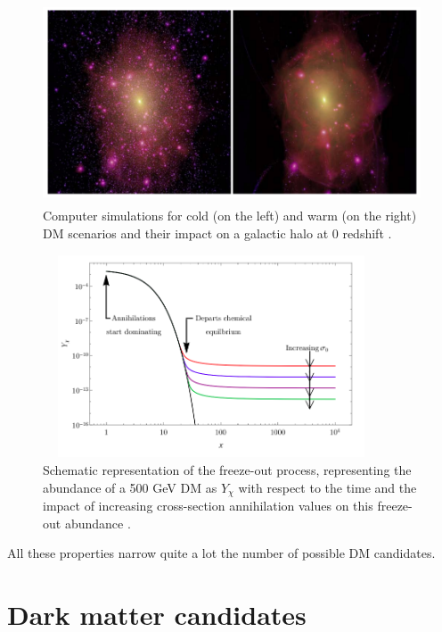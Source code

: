 \documentclass[a4paper, 10pt, openright]{report}
\begin{document}
\begin{figure}[htbp]
\begin{center}
\includegraphics[width=14cm, height=6cm]{figs/ColdWarmDM.png}
\caption{Computer simulations for cold (on the left) and warm (on the right) \ac{DM} scenarios and their impact on a galactic halo at 0 redshift \cite{ColdWarmDM}.}
\label{figure:ColdWarmDM}
\end{center}
\end{figure}

\begin{figure}[htbp]
\begin{center}
\includegraphics[width=10cm, height=6cm]{figs/FreezeOut.png}
\caption{Schematic representation of the freeze-out process, representing the abundance of a 500 GeV \ac{DM} as $Y_\chi$ with respect to the time and the impact of increasing cross-section annihilation values on this freeze-out abundance \cite{FreezeOut2}.}
\label{figure:FreezeOut}
\end{center}
\end{figure}

All these properties narrow quite a lot the number of possible \ac{DM} candidates.

\section{Dark matter candidates} \label{section:DMCandidates}
\end{document}
